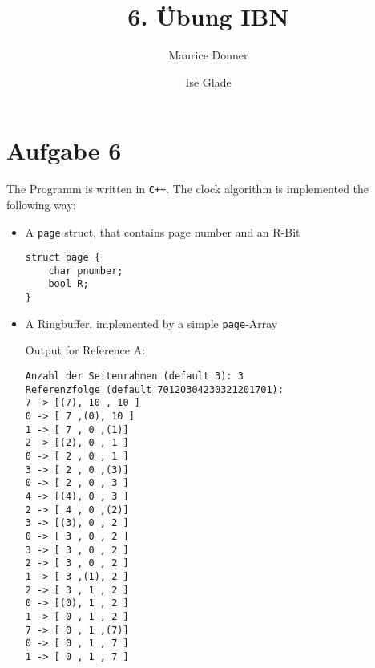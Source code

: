 \documentclass{article}
\title{\textsf{\color{blue!40!black}6. Übung IBN}}
\author{Maurice Donner \and Ise Glade}
\begin{document}
\section{Aufgabe 6}
The Programm is written in \texttt{C++}. The clock algorithm
is implemented the following way:\\
\begin{itemize}
    \item A \texttt{page} struct, that contains page number and an R-Bit
\begin{lstlisting}
struct page {
    char pnumber;
    bool R;
}
\end{lstlisting}
    \item A Ringbuffer, implemented by a simple \texttt{page}-Array

Output for Reference A:

\begin{lstlisting}
Anzahl der Seitenrahmen (default 3): 3
Referenzfolge (default 70120304230321201701): 
7 -> [(7), 10 , 10 ]
0 -> [ 7 ,(0), 10 ]
1 -> [ 7 , 0 ,(1)]
2 -> [(2), 0 , 1 ]
0 -> [ 2 , 0 , 1 ]
3 -> [ 2 , 0 ,(3)]
0 -> [ 2 , 0 , 3 ]
4 -> [(4), 0 , 3 ]
2 -> [ 4 , 0 ,(2)]
3 -> [(3), 0 , 2 ]
0 -> [ 3 , 0 , 2 ]
3 -> [ 3 , 0 , 2 ]
2 -> [ 3 , 0 , 2 ]
1 -> [ 3 ,(1), 2 ]
2 -> [ 3 , 1 , 2 ]
0 -> [(0), 1 , 2 ]
1 -> [ 0 , 1 , 2 ]
7 -> [ 0 , 1 ,(7)]
0 -> [ 0 , 1 , 7 ]
1 -> [ 0 , 1 , 7 ]
\end{lstlisting}

\end{itemize}
\end{document}
